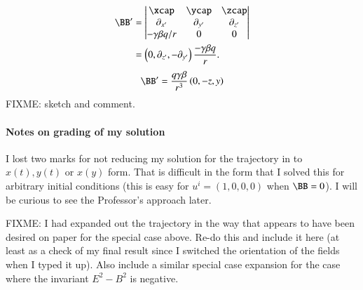 {%
\begin{equation}\label{eqn:relElectroDynProblemSet2:1270}
\begin{aligned}
\BB'
&=
\begin{vmatrix}
\xcap & \ycap & \zcap \\
\partial_{x'} & \partial_{y'} & \partial_{z'} \\
-\gamma \beta q/r & 0 & 0
\end{vmatrix} \\
&=
\left( 0, \partial_{z'}, -\partial_{y'} \right) \frac{-\gamma \beta q}{r}.
\end{aligned}
\end{equation}
%
\begin{equation}\label{eqn:relElectroDynProblemSet2:1090}
\BB'
=
\frac{q \gamma \beta}{r^3} \left( 0, -z, y \right)
\end{equation}
%
FIXME: sketch and comment.
%
\paragraph{Notes on grading of my solution}
%
I lost two marks for not reducing my solution for the trajectory in  to \(x(t), y(t)\) or \(x(y)\) form.  That is difficult in the form that I solved this for arbitrary initial conditions (this is easy for \(u^i = (1, 0, 0, 0)\) when \(\BB = 0\)).  I will be curious to see the Professor's approach later.

FIXME: I had expanded out the trajectory in the way that appears to have been desired on paper for the special case above.  Re-do this and include it here (at least as a check of my final result since I switched the orientation of the fields when I typed it up).  Also include a similar special case expansion for the case where the invariant \(E^2 - B^2\) is negative.

}



